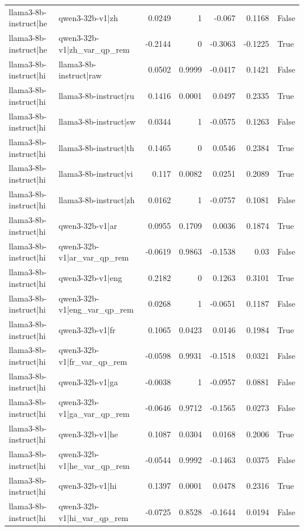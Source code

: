 \begin{table}
\begin{tabular}{l l r r r r l}
llama3-8b-instruct|he & qwen3-32b-v1|zh & 0.0249 & 1 & -0.067 & 0.1168 & False \\
llama3-8b-instruct|he & qwen3-32b-v1|zh_var_qp_rem & -0.2144 & 0 & -0.3063 & -0.1225 & True \\
llama3-8b-instruct|hi & llama3-8b-instruct|raw & 0.0502 & 0.9999 & -0.0417 & 0.1421 & False \\
llama3-8b-instruct|hi & llama3-8b-instruct|ru & 0.1416 & 0.0001 & 0.0497 & 0.2335 & True \\
llama3-8b-instruct|hi & llama3-8b-instruct|sw & 0.0344 & 1 & -0.0575 & 0.1263 & False \\
llama3-8b-instruct|hi & llama3-8b-instruct|th & 0.1465 & 0 & 0.0546 & 0.2384 & True \\
llama3-8b-instruct|hi & llama3-8b-instruct|vi & 0.117 & 0.0082 & 0.0251 & 0.2089 & True \\
llama3-8b-instruct|hi & llama3-8b-instruct|zh & 0.0162 & 1 & -0.0757 & 0.1081 & False \\
llama3-8b-instruct|hi & qwen3-32b-v1|ar & 0.0955 & 0.1709 & 0.0036 & 0.1874 & True \\
llama3-8b-instruct|hi & qwen3-32b-v1|ar_var_qp_rem & -0.0619 & 0.9863 & -0.1538 & 0.03 & False \\
llama3-8b-instruct|hi & qwen3-32b-v1|eng & 0.2182 & 0 & 0.1263 & 0.3101 & True \\
llama3-8b-instruct|hi & qwen3-32b-v1|eng_var_qp_rem & 0.0268 & 1 & -0.0651 & 0.1187 & False \\
llama3-8b-instruct|hi & qwen3-32b-v1|fr & 0.1065 & 0.0423 & 0.0146 & 0.1984 & True \\
llama3-8b-instruct|hi & qwen3-32b-v1|fr_var_qp_rem & -0.0598 & 0.9931 & -0.1518 & 0.0321 & False \\
llama3-8b-instruct|hi & qwen3-32b-v1|ga & -0.0038 & 1 & -0.0957 & 0.0881 & False \\
llama3-8b-instruct|hi & qwen3-32b-v1|ga_var_qp_rem & -0.0646 & 0.9712 & -0.1565 & 0.0273 & False \\
llama3-8b-instruct|hi & qwen3-32b-v1|he & 0.1087 & 0.0304 & 0.0168 & 0.2006 & True \\
llama3-8b-instruct|hi & qwen3-32b-v1|he_var_qp_rem & -0.0544 & 0.9992 & -0.1463 & 0.0375 & False \\
llama3-8b-instruct|hi & qwen3-32b-v1|hi & 0.1397 & 0.0001 & 0.0478 & 0.2316 & True \\
llama3-8b-instruct|hi & qwen3-32b-v1|hi_var_qp_rem & -0.0725 & 0.8528 & -0.1644 & 0.0194 & False \\

\end{tabular}
\end{table}
